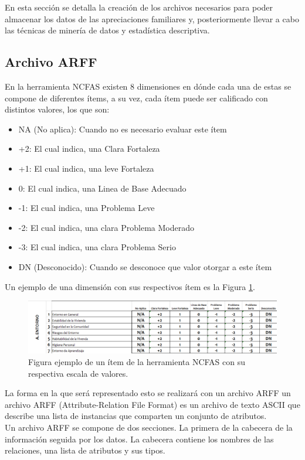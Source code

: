En esta sección se detalla la creación de los archivos necesarios para poder almacenar los datos de las apreciaciones familiares y, posteriormente llevar a cabo las técnicas de minería de datos y estadística descriptiva. 

\subsection{Archivo ARFF}

En la herramienta NCFAS existen 8 dimensiones en dónde cada una de estas se compone de diferentes ítems, a su vez, cada ítem puede ser calificado con distintos valores, los que son:

\begin{itemize}
	\item NA (No aplica): Cuando no es necesario evaluar este ítem
	\item +2: El cual indica, una Clara Fortaleza 
	\item +1: El cual indica, una leve Fortaleza
	\item 0: El cual indica, una Linea de Base Adecuado
	\item -1: El cual indica, una Problema Leve
	\item -2: El cual indica, una clara Problema Moderado
	\item -3: El cual indica, una clara Problema Serio
	\item DN (Desconocido): Cuando se desconoce que valor otorgar a este ítem
\end{itemize}

Un ejemplo de una dimensión con sus respectivos ítem es la Figura \ref{escalaejem}.\\

\begin{figure}[h!]
	\label{escalaejem}
	\begin{center}
		\includegraphics[scale=0.4]{imagenes/escalaejem.png}
	\end{center}
	\caption{Figura ejemplo de un ítem de la herramienta NCFAS con su respectiva escala de valores.}
\end{figure}



La forma en la que será representado esto se realizará con un archivo ARFF un archivo ARFF (Attribute-Relation File Format) es un archivo de texto ASCII que describe una lista de instancias que comparten un conjunto de atributos.\\
Un archivo ARFF se compone de dos secciones. La primera de la cabecera de la información seguida por los datos. La cabecera contiene los nombres de las relaciones, una lista de atributos y sus tipos.

